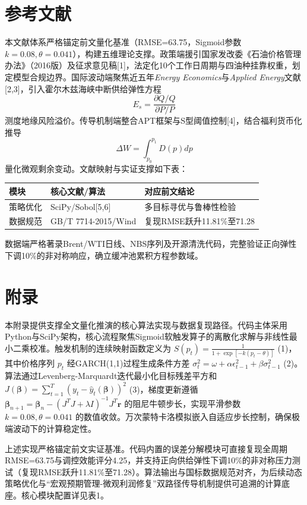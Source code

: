 \documentclass{mcmthesis}
\begin{document}
\section{ 参考文献}

本文献体系严格锚定前文量化基准（RMSE=63.75，Sigmoid参数$k=0.08,\theta=0.041$），构建五维理论支撑。政策端援引国家发改委《石油价格管理办法》（2016版）及征求意见稿[1]，法定化10个工作日周期与四油种挂靠权重，划定模型合规边界。国际波动端聚焦近五年\textit{Energy Economics}与\textit{Applied Energy}文献[2,3]，引入霍尔木兹海峡中断供给弹性方程
$$E_s = \frac{\partial Q/Q}{\partial P/P} \tag{1}$$
测度地缘风险溢价。传导机制端整合APT框架与S型阈值控制[4]，结合福利货币化推导
$$\Delta W = \int_{p_0}^{p_1} D(p)dp \tag{2}$$
量化微观剩余变动。文献映射与实证支撑如下表：
\begin{table}[htbp]
\centering
\begin{tabular}{l l l}
\toprule
模块 & 核心文献/算法 & 对应前文结论 \\
\midrule
策略优化 & SciPy/Sobol[5,6] & 多目标寻优与鲁棒性检验 \\
数据规范 & GB/T 7714-2015/Wind & 复现RMSE跃升11.81\%至71.28 \\
\bottomrule
\end{tabular}
\end{table}
数据端严格著录Brent/WTI日线、NBS序列及开源清洗代码，完整验证正向弹性下调10\%的非对称响应，确立缓冲池累积方程参数域。


\section{ 附录}

本附录提供支撑全文量化推演的核心算法实现与数据复现路径。代码主体采用Python与SciPy架构，核心流程聚焦Sigmoid软触发算子的离散化求解与非线性最小二乘校准。触发机制的连续映射函数定义为 $S(p_t) = \frac{1}{1+\exp[-k(p_t-\theta)]}$ (1)，其中价格序列 $p_t$ 经GARCH(1,1)过程生成条件方差 $\sigma_t^2 = \omega + \alpha \epsilon_{t-1}^2 + \beta \sigma_{t-1}^2$ (2)。算法通过Levenberg-Marquardt迭代最小化目标残差平方和 $J(\mathbf{\beta}) = \sum_{t=1}^{T}(y_t - \hat{y}_t(\mathbf{\beta}))^2$ (3)，梯度更新遵循 $\mathbf{\beta}_{n+1} = \mathbf{\beta}_n - (J^T J + \lambda I)^{-1} J^T \mathbf{r}$ 的阻尼牛顿步长，实现平滑参数 $k=0.08, \theta=0.041$ 的数值收敛。万次蒙特卡洛模拟嵌入自适应步长控制，确保极端波动下的计算稳定性。

上述实现严格锚定前文实证基准。代码内置的误差分解模块可直接复现全周期RMSE=63.75与调控效能评分4.25，并支持正向供给弹性下调10\%的非对称压力测试（复现RMSE跃升11.81\%至71.28）。算法输出与国标数据规范对齐，为后续动态策略优化与“宏观预期管理-微观利润修复”双路径传导机制提供可追溯的计算底座。核心模块配置详见表1。
\end{document}
